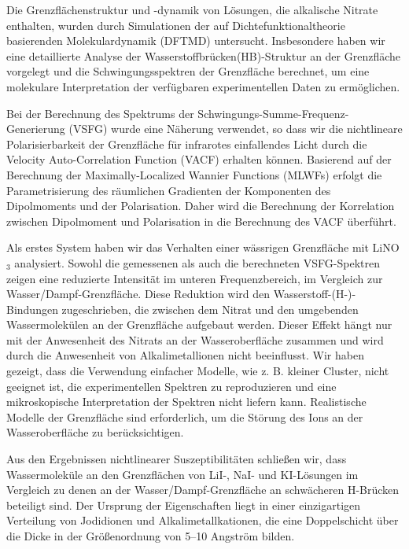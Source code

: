 \documentclass[
11pt, %
ngerman,
english, %
singlespacing, %
headsepline, %
]{MastersDoctoralThesis} %
\begin{document}
{
\begin{extraAbstract}
\addchaptertocentry{\abstractname} %
Die Grenzflächenstruktur und -dynamik von Lösungen, die alkalische Nitrate enthalten, wurden durch Simulationen der auf Dichtefunktionaltheorie basierenden Molekulardynamik (DFTMD) untersucht. Insbesondere haben wir eine detaillierte Analyse der Wasserstoffbrücken(HB)-Struktur an der Grenzfläche vorgelegt und die Schwingungsspektren der Grenzfläche berechnet, um eine molekulare Interpretation der verfügbaren experimentellen Daten zu ermöglichen.

Bei der Berechnung des Spektrums der Schwingungs-Summe-Frequenz-Generierung (VSFG) wurde eine Näherung verwendet, so dass wir die nichtlineare Polarisierbarkeit der Grenzfläche für infrarotes einfallendes Licht durch die Velocity Auto-Correlation Function (VACF) erhalten können. Basierend auf der Berechnung der Maximally-Localized Wannier Functions (MLWFs) erfolgt die Parametrisierung des räumlichen Gradienten der Komponenten des Dipolmoments und der Polarisation. Daher wird die Berechnung der Korrelation zwischen Dipolmoment und Polarisation in die Berechnung des VACF überführt.

%
Als erstes System haben wir das Verhalten einer wässrigen Grenzfläche mit LiNO$_3$ analysiert. Sowohl die gemessenen als auch die berechneten VSFG-Spektren zeigen eine reduzierte Intensität im unteren Frequenzbereich,
im Vergleich zur Wasser/Dampf-Grenzfläche. Diese Reduktion wird den Wasserstoff-(H-)-Bindungen zugeschrieben, die zwischen dem Nitrat und den umgebenden Wassermolekülen an der Grenzfläche aufgebaut werden. Dieser Effekt hängt nur mit der Anwesenheit des Nitrats an der Wasseroberfläche zusammen und wird durch die Anwesenheit von Alkalimetallionen nicht beeinflusst. Wir haben gezeigt, dass die Verwendung einfacher Modelle, wie z. B. kleiner Cluster, nicht geeignet ist, die experimentellen Spektren zu reproduzieren und eine mikroskopische Interpretation der Spektren nicht liefern kann. Realistische Modelle der Grenzfläche sind erforderlich, um die Störung des Ions an der Wasseroberfläche zu berücksichtigen.

%
Aus den Ergebnissen nichtlinearer Suszeptibilitäten schließen wir, dass Wassermoleküle an den Grenzflächen von LiI-, NaI- und KI-Lösungen im Vergleich zu denen an der Wasser/Dampf-Grenzfläche an schwächeren H-Brücken beteiligt sind. Der Ursprung der Eigenschaften liegt in einer einzigartigen Verteilung von Jodidionen und Alkalimetallkationen, die eine Doppelschicht über die Dicke in der Größenordnung von 5--10 Angström bilden.


\end{extraAbstract}}
\end{document}
